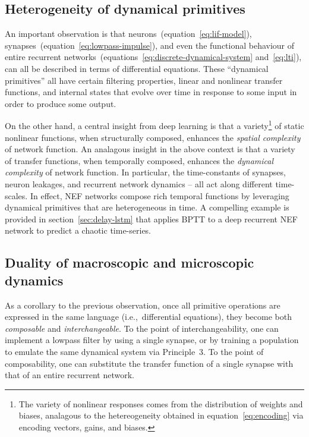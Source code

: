 \subsection{Heterogeneity of dynamical primitives}

An important observation is that neurons~(equation~\ref{eq:lif-model}), synapses~(equation~\ref{eq:lowpass-impulse}), and even the functional behaviour of entire recurrent networks~(equations~\ref{eq:discrete-dynamical-system} and~\ref{eq:lti}), can all be described in terms of differential equations.
These ``dynamical primitives'' all have certain filtering properties, linear and nonlinear transfer functions, and internal states that evolve over time in response to some input in order to produce some output.

On the other hand, a central insight from deep learning is that a variety\footnote{
The variety of nonlinear responses comes from the distribution of weights and biases, analagous to the hetereogeneity obtained in equation~\ref{eq:encoding} via encoding vectors, gains, and biases.}
of static nonlinear functions, when structurally composed, enhances the \emph{spatial complexity} of network function.
An analagous insight in the above context is that a variety of transfer functions, when temporally composed, enhances the \emph{dynamical complexity} of network function.
In particular, the time-constants of synapses, neuron leakages, and recurrent network dynamics -- all act along different time-scales.
In effect, NEF networks compose rich temporal functions by leveraging dynamical primitives that are heterogeneous in time.
A compelling example is provided in section~\ref{sec:delay-lstm} that applies BPTT to a deep recurrent NEF network to predict a chaotic time-series.

\subsection{Duality of macroscopic and microscopic dynamics}

As a corollary to the previous observation,
once all primitive operations are expressed in the same language (i.e.,~differential equations), they become both \emph{composable} and \emph{interchangeable}.
To the point of interchangeability, one can implement a lowpass filter by using a single synapse, or by training a population to emulate the same dynamical system via Principle~3.
To the point of composability, one can substitute the transfer function of a single synapse with that of an entire recurrent network.

